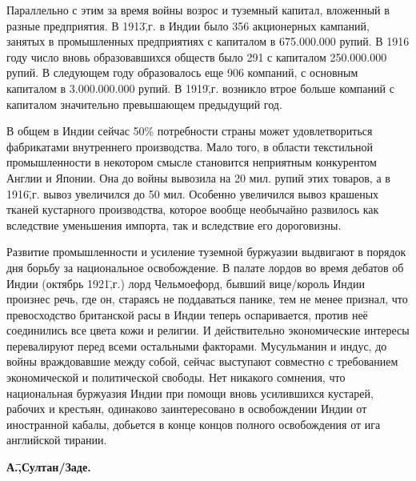 Параллельно с этим за время войны возрос и туземный капитал, вложенный в разные предприятия. В 1913\=,г. в Индии было 356 акционерных кампаний, занятых в промышленных предприятиях с капиталом в 675.000.000 рупий. В 1916 году число вновь образовавшихся обществ было 291 с капиталом 250.000.000 рупий. В следующем году образовалось еще 906 компаний, с основным капиталом в 3.000.000.000 рупий. В 1919\=,г. возникло втрое больше компаний с капиталом значительно превышающем предыдущий год.

В общем в Индии сейчас 50\% потребности страны может удовлетвориться фабрикатами внутреннего производства. Мало того, в области текстильной промышленности в некотором смысле становится неприятным конкурентом Англии и Японии. Она до войны вывозила на 20 мил. рупий этих товаров, а в 1916\=,г. вывоз увеличился до 50 мил. Особенно увеличился вывоз крашеных тканей кустарного производства, которое вообще необычайно развилось как вследствие уменьшения импорта, так и вследствие его дороговизны.

Развитие промышленности и усиление туземной буржуазии выдвигают в порядок дня борьбу за национальное освобождение. В палате лордов во время дебатов об Индии (октябрь 1921\=,г.) лорд Чельмоефорд, бывший вице\-/король Индии произнес речь, где он, стараясь не поддаваться панике, тем не менее признал, что превосходство британской расы в Индии теперь оспаривается, против неё соединились все цвета кожи и религии. И действительно экономические интересы перевалируют перед всеми остальными факторами. Мусульманин и индус, до войны враждовавшие между собой, сейчас выступают совместно с требованием экономической и политической свободы. Нет никакого сомнения, что национальная буржуазия Индии при помощи вновь усилившихся кустарей, рабочих и крестьян, одинаково заинтересовано в освобождении Индии от иностранной кабалы, добьется в конце концов полного освобождения от ига английской тирании.

\begin{flushright}
 \textbf{А.\=,Султан\-/Заде.}\hspace*{2em}
\end{flushright}
